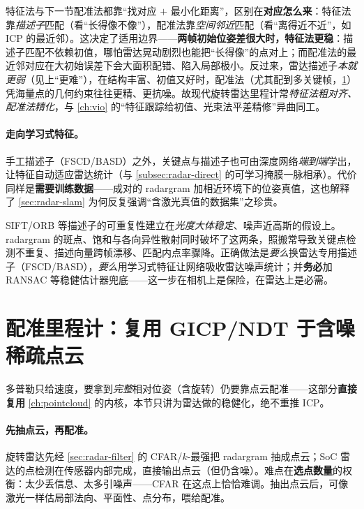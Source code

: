 \begin{insight}\label{ins:radar-feature-vs-reg}
特征法与下一节配准法都靠“找对应 $+$ 最小化距离”，区别在\textbf{对应怎么来}：特征法靠\emph{描述子}匹配（看“长得像不像”），配准法靠\emph{空间邻近}匹配（看“离得近不近”，如 ICP 的最近邻）。这决定了适用边界——\textbf{两帧初始位姿差很大时，特征法更稳}：描述子匹配不依赖初值，哪怕雷达晃动剧烈也能把“长得像”的点对上；而配准法的最近邻对应在大初始误差下会大面积配错、陷入局部极小。反过来，雷达描述子\emph{本就更弱}（见上“更难”），在结构丰富、初值又好时，配准法（尤其配到多关键帧，\cref{sec:radar-reg}）凭海量点的几何约束往往更精、更抗噪。故现代旋转雷达里程计常\emph{特征法粗对齐、配准法精化}，与 \cref{ch:vio} 的“特征跟踪给初值、光束法平差精修”异曲同工。
\end{insight}

\paragraph{走向学习式特征。}
手工描述子（FSCD/BASD）之外，关键点与描述子也可由深度网络\emph{端到端}学出，让特征自动适应雷达统计\cite{carlone2026handbook}（与 \cref{subsec:radar-direct} 的可学习掩膜一脉相承）。代价同样是\textbf{需要训练数据}——成对的 radargram 加相近环境下的位姿真值，这也解释了 \cref{sec:radar-slam} 为何反复强调“含激光真值的数据集”之珍贵。

\begin{pitfall}
SIFT/ORB 等描述子的可重复性建立在\emph{光度大体稳定}、噪声近高斯的假设上。radargram 的斑点、饱和与各向异性散射同时破坏了这两条，照搬常导致关键点检测不重复、描述向量跨帧漂移、匹配内点率骤降。正确做法是\emph{要么}换雷达专用描述子（FSCD/BASD），\emph{要么}用学习式特征让网络吸收雷达噪声统计；并\textbf{务必}加 RANSAC 等稳健估计器兜底——这一步在相机上是保险，在雷达上是必需。
\end{pitfall}

\section{配准里程计：复用 GICP/NDT 于含噪稀疏点云}
\label{sec:radar-reg}

多普勒只给速度，要拿到\emph{完整}相对位姿（含旋转）仍要靠点云配准——这部分\textbf{直接复用} \cref{ch:pointcloud} 的内核，本节只讲为雷达做的稳健化，绝不重推 ICP。

\paragraph{先抽点云，再配准。}
旋转雷达先经 \cref{sec:radar-filter} 的 CFAR/$k$-最强把 radargram 抽成点云；SoC 雷达的点检测在传感器内部完成，直接输出点云（但仍含噪）。难点在\textbf{选点数量}的权衡：太少丢信息、太多引噪声——CFAR 在这点上恰恰难调\cite{carlone2026handbook}。抽出点云后，可像激光一样估局部法向、平面性、点分布，喂给配准。

